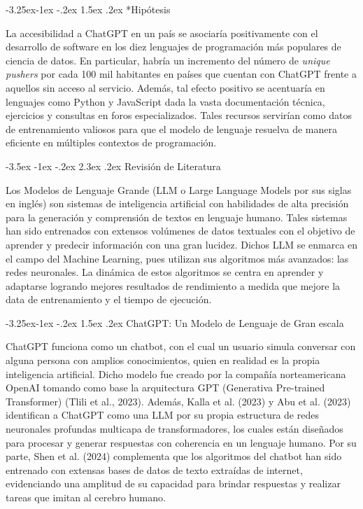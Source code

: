 \documentclass[12pt,a4paper]{article}
\makeatletter
\renewcommand\section{\@startsection{section}{1}{\z@}%
  {-3.5ex \@plus -1ex \@minus -.2ex}%
  {2.3ex \@plus.2ex}%
  {\normalfont\normalsize}}
\renewcommand\subsection{\@startsection{subsection}{2}{\z@}%
  {-3.25ex\@plus -1ex \@minus -.2ex}%
  {1.5ex \@plus .2ex}%
  {\normalfont\normalsize}}
\makeatother
\begin{document}
\label{sec:hipotesis}
\subsection*{Hipótesis}

La accesibilidad a ChatGPT en un país se asociaría positivamente con el desarrollo de software en los diez lenguajes de programación más populares de ciencia de datos. En particular, habría un incremento del número de \textit{unique pushers} por cada 100 mil habitantes en países que cuentan con ChatGPT frente a aquellos sin acceso al servicio. Además, tal efecto positivo se acentuaría en lenguajes como Python y JavaScript dada la vasta documentación técnica, ejercicios y consultas en foros especializados. Tales recursos servirían como datos de entrenamiento valiosos para que el modelo de lenguaje resuelva de manera eficiente en múltiples contextos de programación.

\clearpage
\section{Revisión de Literatura}

Los Modelos de Lenguaje Grande (LLM o Large Language Models por sus siglas en inglés) son sistemas de inteligencia artificial con habilidades de alta precisión para la generación y comprensión de textos en lenguaje humano. Tales sistemas han sido entrenados con extensos volúmenes de datos textuales con el objetivo de aprender y predecir información con una gran lucidez. Dichos LLM se enmarca en el campo del Machine Learning, pues utilizan sus algoritmos más avanzados: las redes neuronales. La dinámica de estos algoritmos se centra en aprender y adaptarse logrando mejores resultados de rendimiento a medida que mejore la data de entrenamiento y el tiempo de ejecución.



\subsection{ChatGPT: Un Modelo de Lenguaje de Gran escala}

ChatGPT funciona como un chatbot, con el cual un usuario simula conversar con alguna persona con amplios conocimientos, quien en realidad es la propia inteligencia artificial. Dicho modelo fue creado por la compañía norteamericana OpenAI tomando como base la arquitectura GPT (Generativa Pre-trained Transformer) (Tlili et al., 2023). Además, Kalla et al. (2023) y Abu et al. (2023) identifican a ChatGPT como una LLM por su propia estructura de redes neuronales profundas multicapa de transformadores, los cuales están diseñados para procesar y generar respuestas con coherencia en un lenguaje humano. Por su parte, Shen et al. (2024) complementa que los algoritmos del chatbot han sido entrenado con extensas bases de datos de texto extraídas de internet, evidenciando una amplitud de su capacidad para brindar respuestas y realizar tareas que imitan al cerebro humano.
\end{document}
